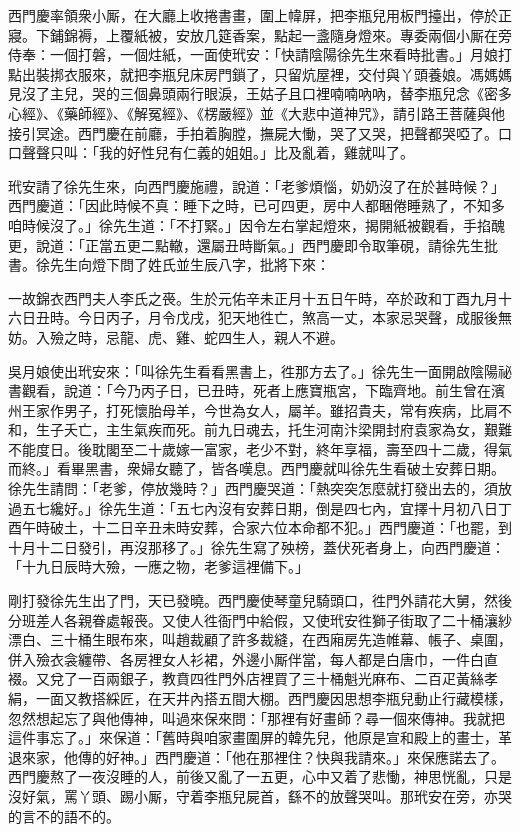 西門慶率領衆小厮，在大廳上收捲書畫，圍上幃屏，把李瓶兒用板門擡出，停於正寢。下鋪錦褥，上覆紙被，安放几筵香案，點起一盞隨身燈來。專委兩個小厮在旁侍奉：一個打磐，一個炷紙，一面使玳安：「快請陰陽徐先生來看時批書。」月娘打點出裝挷衣服來，就把李瓶兒床房門鎖了，只留炕屋裡，交付與丫頭養娘。馮媽媽見沒了主兒，哭的三個鼻頭兩行眼淚，王姑子且口裡喃喃吶吶，{}替李瓶兒念《密多心經》、《藥師經》、《解冤經》、《楞嚴經》並《大悲中道神咒》，請引路王菩薩與他接引冥途。西門慶在前廳，手拍着胸膛，撫屍大慟，哭了又哭，把聲都哭啞了。口口聲聲只叫：「我的好性兒有仁義的姐姐。」比及亂着，雞就叫了。

玳安請了徐先生來，向西門慶施禮，說道：「老爹煩惱，奶奶沒了在於甚時候？」西門慶道：「因此時候不真：睡下之時，已可四更，房中人都睏倦睡熟了，不知多咱時候沒了。」徐先生道：「不打緊。」因令左右掌起燈來，揭開紙被觀看，手掐醜更，說道：「正當五更二點轍，還屬丑時斷氣。」西門慶即令取筆硯，請徐先生批書。徐先生向燈下問了姓氏並生辰八字，批將下來：

\begin{myquote}[\markfont]
一故錦衣西門夫人李氏之䘮。生於元佑辛未正月十五日午時，卒於政和丁酉九月十六日丑時。今日丙子，月令戊戌，犯天地徃亡，煞高一丈，本家忌哭聲，成服後無妨。入殮之時，忌龍、虎、雞、蛇四生人，親人不避。
\end{myquote}

吳月娘使出玳安來：「叫徐先生看看黑書上，徃那方去了。」徐先生一面開啟陰陽祕書觀看，說道：「今乃丙子日，已丑時，死者上應寶瓶宮，下臨齊地。前生曾在濱州王家作男子，打死懷胎母羊，今世為女人，屬羊。雖招貴夫，常有疾病，比肩不和，生子夭亡，主生氣疾而死。前九日魂去，托生河南汴梁開封府袁家為女，艱難不能度日。後耽閣至二十歲嫁一富家，老少不對，終年享福，壽至四十二歲，得氣而終。」{}看畢黑書，衆婦女聽了，皆各嘆息。西門慶就叫徐先生看破土安葬日期。徐先生請問：「老爹，停放幾時？」西門慶哭道：「熱突突怎麼就打發出去的，須放過五七纔好。」徐先生道：「五七內沒有安葬日期，倒是四七內，宜擇十月初八日丁酉午時破土，十二日辛丑未時安葬，合家六位本命都不犯。」西門慶道：「也罷，到十月十二日發引，再沒那移了。」徐先生寫了殃榜，蓋伏死者身上，向西門慶道：「十九日辰時大殮，一應之物，老爹這裡備下。」

剛打發徐先生出了門，天已發曉。西門慶使琴童兒騎頭口，徃門外請花大舅，然後分班差人各親眷處報䘮。又使人徃衙門中給假，又使玳安徃獅子街取了二十桶瀼紗漂白、三十桶生眼布來，叫趙裁顧了許多裁縫，在西廂房先造帷幕、帳子、桌圍，併入殮衣衾纏帶、各房裡女人衫裙，外邊小厮伴當，每人都是白唐巾，一件白直裰。又兌了一百兩銀子，教賁四徃門外店裡買了三十桶魁光麻布、二百疋黃絲孝絹，一面又教搭綵匠，在天井內搭五間大棚。西門慶因思想李瓶兒動止行藏模樣，忽然想起忘了與他傳神，叫過來保來問：「那裡有好畫師？尋一個來傳神。我就把這件事忘了。」來保道：「舊時與咱家畫圍屏的韓先兒，他原是宣和殿上的畫士，革退來家，他傳的好神。」西門慶道：「他在那裡住？快與我請來。」來保應諾去了。西門慶熬了一夜沒睡的人，前後又亂了一五更，心中又着了悲慟，神思恍亂，只是沒好氣，罵丫頭、踢小厮，守着李瓶兒屍首，繇不的放聲哭叫。那玳安在旁，亦哭的言不的語不的。{}{}

